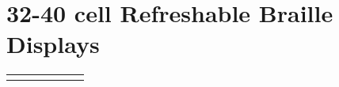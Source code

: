 \documentclass[14pt, letterpaper,twoside]{extreport}
\begin{document}
\pagebreak \hypertarget{cell-refreshable-braille-displays}{%
\section*{32-40 cell Refreshable Braille
Displays}\label{cell-refreshable-braille-displays}}

\begin{longtable}[]{@{}
 >{\raggedright\arraybackslash}p{}
 >{\raggedright\arraybackslash}p{}
 >{\raggedright\arraybackslash}p{}
 >{\raggedright\arraybackslash}p{}
 >{\raggedright\arraybackslash}p{}
 >{\raggedright\arraybackslash}p{}
 >{\raggedright\arraybackslash}p{}@{}
 }
\toprule\noalign{}


\end{longtable}
\end{document}
